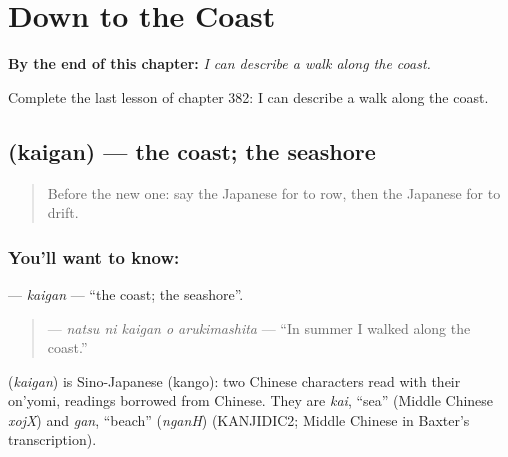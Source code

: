 
\chapter{Down to the Coast}
\label{ch:ja-down-to-the-coast}

\begin{chapteropening}
\textbf{By the end of this chapter:} \emph{I can describe a walk along the coast.}

Complete the last lesson of chapter 382: I can describe a walk along the coast.
\end{chapteropening}

\section[\texorpdfstring{\ja{かいがん} (kaigan)}{かいがん (kaigan)}]{ (kaigan) — the coast; the seashore}

\label{lesson:JA-C382-kaigan}



\begin{quote}
Before the new one: say the Japanese for to row, then the Japanese for to drift.
\end{quote}

\subsection*{You'll want to know: }
\textbf{} — \emph{kaigan} — \textquotedblleft{}the coast; the seashore\textquotedblright{}.

\begin{quote}
\textbf{  } — \emph{natsu ni kaigan o arukimashita} — \textquotedblleft{}In summer I walked along the coast.\textquotedblright{}
\end{quote}

\begin{cousinweb}
\textbf{} (\emph{kaigan}) is Sino-Japanese (kango): two Chinese characters read with their on'yomi, readings borrowed from Chinese. They are \emph{kai}, \textquotedblleft{}sea\textquotedblright{} (Middle Chinese \emph{xojX}) and \emph{gan}, \textquotedblleft{}beach\textquotedblright{} (\emph{nganH}) (KANJIDIC2; Middle Chinese in Baxter's transcription).
\end{cousinweb}

